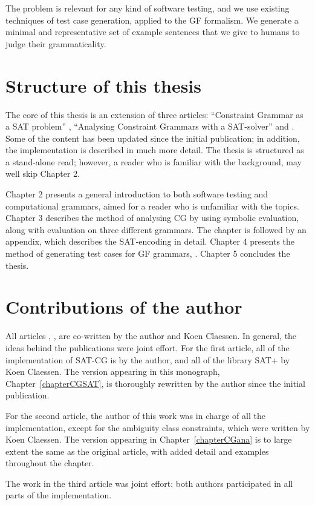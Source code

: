 The problem is relevant for any kind of software testing, and we use existing techniques of test case generation, applied to the GF formalism. We generate a minimal and representative set of example sentences that we give to humans to judge their grammaticality.




\section{Structure of this thesis}

The core of this thesis is an extension of three articles: ``Constraint Grammar as a SAT problem'' \cite{listenmaa_claessen2015}, ``Analysing Constraint Grammars with a SAT-solver'' \cite{listenmaa_claessen2016}
and . Some of the content has been updated since the initial publication; in addition, the implementation is described in much more detail. The thesis is structured as a stand-alone read; however, a reader who is familiar with the background, may well skip Chapter 2.

Chapter 2 presents a general introduction to both software testing and computational grammars, aimed for a reader who is unfamiliar with the topics.
Chapter 3 describes the method of analysing CG by using symbolic evaluation, along with evaluation on three different grammars.
The chapter is followed by an appendix, which describes the SAT-encoding in detail.
Chapter 4 presents the method of generating test cases for GF grammars, .
Chapter 5 concludes the thesis.


\section{Contributions of the author}

All articles \cite{listenmaa_claessen2015}, \cite{listenmaa_claessen2016}, 
are co-written by the author and Koen Claessen. In general, the ideas behind the publications were joint effort.
For the first article, all of the implementation of SAT-CG is by the author,
and all of the library SAT+ by Koen Claessen.
The version appearing in this monograph, Chapter~\ref{chapterCGSAT}, is thoroughly rewritten by the author since the initial publication.

For the second article, the author of this work was in charge of all the implementation, except for the ambiguity class constraints, which were written by Koen Claessen. 
The version appearing in Chapter~\ref{chapterCGana} is to large extent the same as the original article, with added detail and examples throughout the chapter.

The work in the third article was joint effort: both authors participated in all parts of the implementation.


